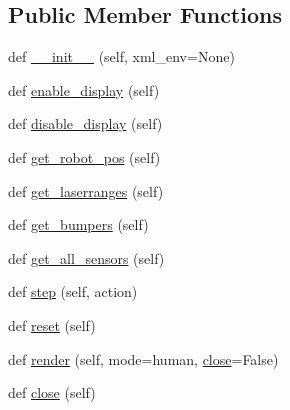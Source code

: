 \subsection*{Public Member Functions}
\begin{DoxyCompactItemize}
\item 
def \hyperlink{classgym__fastsim_1_1simple__nav_1_1nav__env_1_1_simple_nav_env_a19b76589d485b55ff72392fdc5f43c92}{\+\_\+\+\_\+init\+\_\+\+\_\+} (self, xml\+\_\+env=None)
\item 
def \hyperlink{classgym__fastsim_1_1simple__nav_1_1nav__env_1_1_simple_nav_env_aed27002bb7a81a371e3b63e819d073bd}{enable\+\_\+display} (self)
\item 
def \hyperlink{classgym__fastsim_1_1simple__nav_1_1nav__env_1_1_simple_nav_env_a613fc2511da366eb6c28704ade66de0c}{disable\+\_\+display} (self)
\item 
def \hyperlink{classgym__fastsim_1_1simple__nav_1_1nav__env_1_1_simple_nav_env_a18221e2d428a7bf754d4df16786a72fb}{get\+\_\+robot\+\_\+pos} (self)
\item 
def \hyperlink{classgym__fastsim_1_1simple__nav_1_1nav__env_1_1_simple_nav_env_a0fba1962f291cb0bf9d142091bb2bfc6}{get\+\_\+laserranges} (self)
\item 
def \hyperlink{classgym__fastsim_1_1simple__nav_1_1nav__env_1_1_simple_nav_env_a466e0e6474e23b351d4265074592ccba}{get\+\_\+bumpers} (self)
\item 
def \hyperlink{classgym__fastsim_1_1simple__nav_1_1nav__env_1_1_simple_nav_env_a4d3faa737a8702ada58f2da8700645bc}{get\+\_\+all\+\_\+sensors} (self)
\item 
def \hyperlink{classgym__fastsim_1_1simple__nav_1_1nav__env_1_1_simple_nav_env_a6d0169745847d1f897e6c25a27b49804}{step} (self, action)
\item 
def \hyperlink{classgym__fastsim_1_1simple__nav_1_1nav__env_1_1_simple_nav_env_a5b6a5b406857786918cb536e723d9d5d}{reset} (self)
\item 
def \hyperlink{classgym__fastsim_1_1simple__nav_1_1nav__env_1_1_simple_nav_env_a2cc966f85f7c8f793f156b392b34862e}{render} (self, mode=\textquotesingle{}human\textquotesingle{}, \hyperlink{classgym__fastsim_1_1simple__nav_1_1nav__env_1_1_simple_nav_env_a124e0538a7908048f85b906799101f30}{close}=False)
\item 
def \hyperlink{classgym__fastsim_1_1simple__nav_1_1nav__env_1_1_simple_nav_env_a124e0538a7908048f85b906799101f30}{close} (self)
\end{DoxyCompactItemize}
